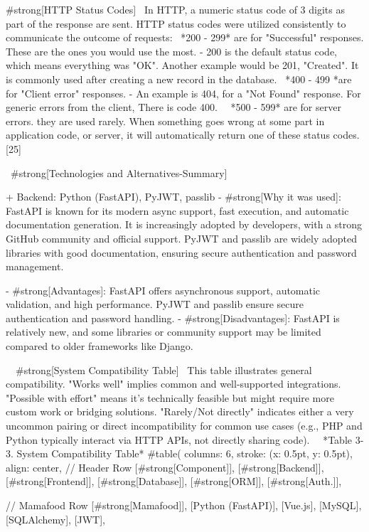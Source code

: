 #strong[HTTP Status Codes]
\
In HTTP, a numeric status code of 3 digits as part of the response are sent.
HTTP status codes were utilized consistently to communicate the outcome of requests:
\
*200 - 299* are for "Successful" responses. These are the ones you would use the most.
  - 200 is the default status code, which means everything was "OK".
    Another example would be 201, "Created". It is commonly used after creating a new record in the database.
\
*400 - 499 *are for "Client error" responses. 
    - An example is 404, for a "Not Found" response.
    For generic errors from the client, There is code 400.
\
\
*500 - 599* are for server errors. they are used rarely. When something goes wrong at some part in application code, or server, it will automatically return one of these status codes. [25]


\
#strong[Technologies and Alternatives-Summary]

 + Backend: Python (FastAPI), PyJWT, passlib
- #strong[Why it was used]: FastAPI is known for its modern async support, fast execution, and automatic documentation generation. It is increasingly adopted by developers, with a strong GitHub community and official support. PyJWT and passlib are widely adopted libraries with good documentation, ensuring secure authentication and password management.

- #strong[Advantages]: FastAPI offers asynchronous support, automatic validation, and high performance. PyJWT and passlib ensure secure authentication and password handling.
- #strong[Disadvantages]: FastAPI is relatively new, and some libraries or community support may be limited compared to older frameworks like Django.
 
\
\
#strong[System Compatibility Table]
\
This table illustrates general compatibility. "Works well" implies common and well-supported integrations. "Possible with effort" means it's technically feasible but might require more custom work or bridging solutions. "Rarely/Not directly" indicates either a very uncommon pairing or direct incompatibility for common use cases (e.g., PHP and Python typically interact via HTTP APIs, not directly sharing code).
\
\
*Table 3-3. System Compatibility Table*
#table(
  columns: 6,
  stroke: (x: 0.5pt, y: 0.5pt),
  align: center,
  // Header Row
  [#strong[Component]],
  [#strong[Backend]],
  [#strong[Frontend]],
  [#strong[Database]],
  [#strong[ORM]],
  [#strong[Auth.]],
  
  

  // Mamafood Row
 [#strong[Mamafood]],
  [Python (FastAPI)],
  [Vue.js],
  [MySQL],
  [SQLAlchemy],
  [JWT],


